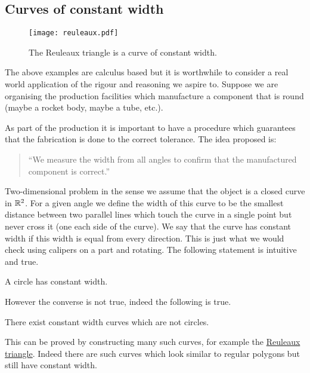 \subsection*{Curves of constant width}
%
\begin{figure}[htb]
  \centering
  \texttt{[image: reuleaux.pdf]}
  \caption{The Reuleaux triangle is a curve of constant width.}%
  \label{fig:reuleaux}
\end{figure}
%
The above examples are calculus based but it is worthwhile to consider a real world application of the rigour and reasoning we aspire to.
Suppose we are organising the production facilities which manufacture a component that is round (maybe a rocket body, maybe a tube, etc.).
\begin{samepage}
  As part of the production it is important to have a procedure which guarantees that the fabrication is done to the correct tolerance.
  The idea proposed is:
  \begin{quotation}
    ``We measure the width from all angles to confirm that the manufactured component is correct.''
  \end{quotation}
\end{samepage}
Two-dimensional problem in the sense we assume that the object is a closed curve in \(\mathbb{R}^2\).
For a given angle we define the width of this curve to be the smallest distance between two parallel lines which touch the curve in a single point but never cross it (one each side of the curve).
We say that the curve has constant width if this width is equal from every direction.
This is just what we would check using calipers on a part and rotating.
The following statement is intuitive and true.
\begin{theorem*}
  A circle has constant width.
\end{theorem*}
\noindent
However the converse is not true, indeed the following is true.
\begin{theorem*}
  There exist constant width curves which are not circles.
\end{theorem*}
\noindent
This can be proved by constructing many such curves, for example the \href{https://en.wikipedia.org/wiki/Reuleaux_triangle}{Reuleaux triangle}. Indeed there are such curves which look similar to regular polygons but still have constant width.





